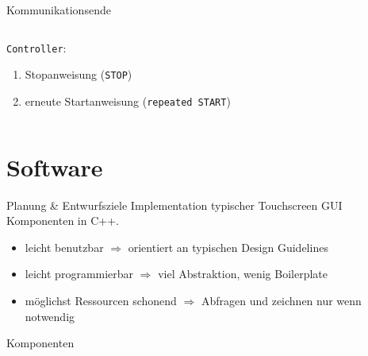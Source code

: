 \documentclass[12pt]{beamer}
\begin{document}
	\begin{frame}{Kommunikationsende}
		\begin{columns}
			\begin{column}{0.55\textwidth}
				\texttt{Controller}:
				\begin{enumerate}[a]
					\item Stopanweisung (\texttt{STOP})
					\item erneute Startanweisung (\texttt{repeated START})
				\end{enumerate}
			\end{column}
			\begin{column}{0.4\textwidth}
				
				
			\end{column}
		\end{columns}
	\end{frame}
	
	\section{Software}
	\frame{\tableofcontents[currentsection]}
	
	\begin{frame}{Planung \& Entwurfsziele}
		Implementation typischer Touchscreen GUI Komponenten in C++.
		\pause
		\bigskip
		\begin{itemize}
			\item leicht benutzbar $\Rightarrow$ orientiert an typischen Design Guidelines \cite{material-components} \pause
			\item leicht programmierbar $\Rightarrow$ viel Abstraktion, wenig Boilerplate \pause
			\item möglichst Ressourcen schonend $\Rightarrow$ Abfragen und zeichnen nur wenn notwendig
		\end{itemize}
	\end{frame}

	\begin{frame}{Komponenten}
		\centering{}
	\end{frame}
\end{document}
